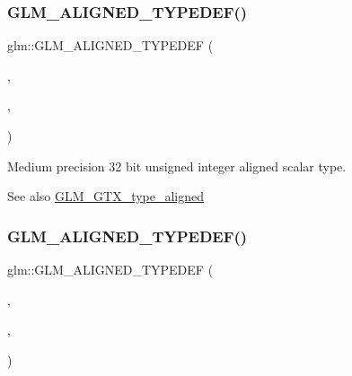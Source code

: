 \subsubsection{\texorpdfstring{G\+L\+M\+\_\+\+A\+L\+I\+G\+N\+E\+D\+\_\+\+T\+Y\+P\+E\+D\+E\+F()}{GLM\_ALIGNED\_TYPEDEF()}\hspace{0.1cm}{\footnotesize\ttfamily [91/209]}}
{\footnotesize\ttfamily glm\+::\+G\+L\+M\+\_\+\+A\+L\+I\+G\+N\+E\+D\+\_\+\+T\+Y\+P\+E\+D\+EF (\begin{DoxyParamCaption}\item[{\hyperlink{group__gtc__type__precision_gad0c27a525045c299a92306eb4cd7c13a}{mediump\+\_\+u32}}]{,  }\item[{aligned\+\_\+mediump\+\_\+u32}]{,  }\item[{4}]{ }\end{DoxyParamCaption})}

Medium precision 32 bit unsigned integer aligned scalar type. \begin{DoxySeeAlso}{See also}
\hyperlink{group__gtx__type__aligned}{G\+L\+M\+\_\+\+G\+T\+X\+\_\+type\+\_\+aligned} 
\end{DoxySeeAlso}
\mbox{\label{group__gtx__type__aligned_gaa0fc531cbaa972ac3a0b86d21ef4a7fa}} 
\subsubsection{\texorpdfstring{G\+L\+M\+\_\+\+A\+L\+I\+G\+N\+E\+D\+\_\+\+T\+Y\+P\+E\+D\+E\+F()}{GLM\_ALIGNED\_TYPEDEF()}\hspace{0.1cm}{\footnotesize\ttfamily [92/209]}}
{\footnotesize\ttfamily glm\+::\+G\+L\+M\+\_\+\+A\+L\+I\+G\+N\+E\+D\+\_\+\+T\+Y\+P\+E\+D\+EF (\begin{DoxyParamCaption}\item[{\hyperlink{group__gtc__type__precision_ga00c51a16fa190b0a90205d50d6d8a44a}{mediump\+\_\+u64}}]{,  }\item[{aligned\+\_\+mediump\+\_\+u64}]{,  }\item[{8}]{ }\end{DoxyParamCaption})}

